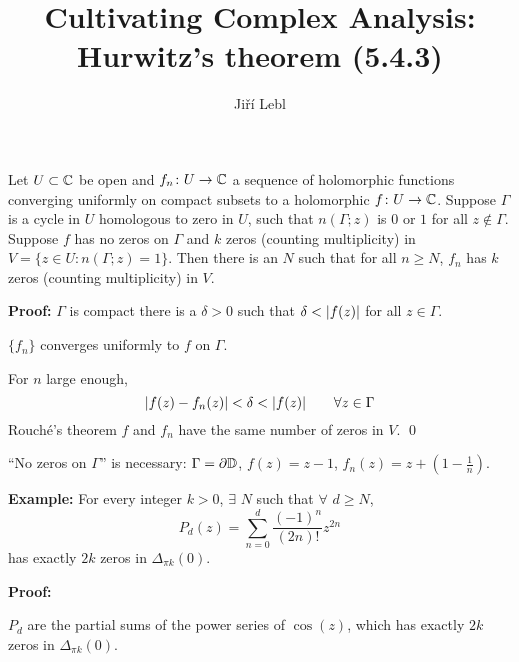 \documentclass[10pt,aspectratio=169]{beamer}
\author{Ji\v{r}\'i Lebl}
\institute[OSU]{%
Departemento pri Matematiko de Oklahoma {\^S}tata Universitato}
\title{Cultivating Complex Analysis:\\%
Hurwitz's theorem (5.4.3)}
\date{}
\begin{document}
\begin{frame}
\titlepage
\end{frame}

\begin{frame}
\begin{theorem}[Hurwitz]
Let $U \subset {\mathbb{C}}$ be open and $f_n \colon U \to {\mathbb{C}}$ a sequence of
holomorphic functions converging uniformly on compact subsets
to a holomorphic $f \colon U \to {\mathbb{C}}$.  Suppose $\Gamma$ is
a cycle in $U$ homologous to zero in $U$,
such that $n(\Gamma;z)$ is $0$ or $1$ for all $z \notin \Gamma$.
Suppose $f$ has no zeros on $\Gamma$ and $k$ zeros (counting
multiplicity) in $V = \{ z \in U : n(\Gamma;z) = 1 \}$.
Then there is an $N$ such that for all $n \geq N$,
$f_n$ has $k$ zeros (counting multiplicity) in $V$.
\end{theorem}

\medskip
\pause

\textbf{Proof:}
$\Gamma$ is compact \wthus
there is a $\delta > 0$ such that $\delta < \lvert {f(z)} \rvert$
for all $z \in \Gamma$.

\medskip
\pause

$\{ f_n \}$
converges uniformly to $f$ on $\Gamma$.

\medskip
\pause

For $n$ large enough,
\begin{equation*}
\lvert {f(z)-f_n(z)} \rvert < \delta < \lvert {f(z)} \rvert
\qquad \forall z \in \Gamma
\end{equation*}
\pause
Rouch\'e's theorem
\wthus
$f$ and $f_n$ have the same number of zeros in $V$.  \qed

\medskip
\pause

``No zeros on $\Gamma$'' is necessary:
\quad $\Gamma = \partial {\mathbb{D}}$,
\quad $f(z) = z-1$, \quad $f_n(z) = z+(1-\frac{1}{n})$.
\end{frame}

\begin{frame}
\textbf{Example:}
For every integer $k > 0$, $\exists$ $N$ such that
$\forall$ $d \geq N$,
\begin{equation*}
P_d(z) = \sum_{n=0}^d \frac{{(-1)}^n}{(2n)!}z^{2n}
\end{equation*}
has exactly $2k$ zeros in $\Delta_{\pi k}(0)$.

\medskip
\pause

\textbf{Proof:}

$P_d$ are the partial sums of the power series of
$\cos(z)$, which has exactly $2k$ zeros in $\Delta_{\pi k}(0)$.
\end{frame}
\end{document}
